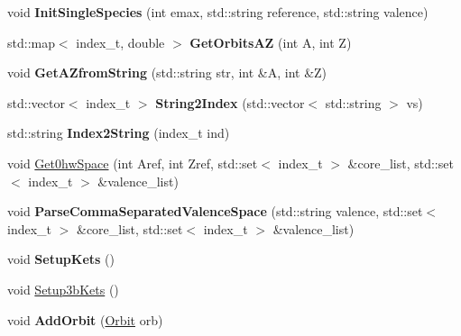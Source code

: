 \begin{DoxyCompactItemize}
\item 
\hypertarget{classModelSpace_acfa5baf0cba768c6abedbd3158892062}{void {\bfseries Init\-Single\-Species} (int emax, std\-::string reference, std\-::string valence)}\label{classModelSpace_acfa5baf0cba768c6abedbd3158892062}

\item 
\hypertarget{classModelSpace_a0cecf7817ce2bbf6c278924fd458e851}{std\-::map$<$ index\-\_\-t, double $>$ {\bfseries Get\-Orbits\-A\-Z} (int A, int Z)}\label{classModelSpace_a0cecf7817ce2bbf6c278924fd458e851}

\item 
\hypertarget{classModelSpace_a2370ffd4ec2d8e63db3a72b4a43784db}{void {\bfseries Get\-A\-Zfrom\-String} (std\-::string str, int \&A, int \&Z)}\label{classModelSpace_a2370ffd4ec2d8e63db3a72b4a43784db}

\item 
\hypertarget{classModelSpace_a11ac7aee125fb0a97cd3f1394c4cdb8f}{std\-::vector$<$ index\-\_\-t $>$ {\bfseries String2\-Index} (std\-::vector$<$ std\-::string $>$ vs)}\label{classModelSpace_a11ac7aee125fb0a97cd3f1394c4cdb8f}

\item 
\hypertarget{classModelSpace_ac22b0378c0775c58268238317b5389ee}{std\-::string {\bfseries Index2\-String} (index\-\_\-t ind)}\label{classModelSpace_ac22b0378c0775c58268238317b5389ee}

\item 
void \hyperlink{classModelSpace_a0e4d51e17aff61a2429eae0939426c16}{Get0hw\-Space} (int Aref, int Zref, std\-::set$<$ index\-\_\-t $>$ \&core\-\_\-list, std\-::set$<$ index\-\_\-t $>$ \&valence\-\_\-list)
\item 
\hypertarget{classModelSpace_a9a49b91242f1e53456ecb14ffbdfdd0c}{void {\bfseries Parse\-Comma\-Separated\-Valence\-Space} (std\-::string valence, std\-::set$<$ index\-\_\-t $>$ \&core\-\_\-list, std\-::set$<$ index\-\_\-t $>$ \&valence\-\_\-list)}\label{classModelSpace_a9a49b91242f1e53456ecb14ffbdfdd0c}

\item 
\hypertarget{classModelSpace_ae1a3578ed5aabec2956998a870a4e2d2}{void {\bfseries Setup\-Kets} ()}\label{classModelSpace_ae1a3578ed5aabec2956998a870a4e2d2}

\item 
void \hyperlink{classModelSpace_a0d453e9dc7fb9ca8c2f2549123e21556}{Setup3b\-Kets} ()
\item 
\hypertarget{classModelSpace_ad8acc2ca5b475862101595d911987a7e}{void {\bfseries Add\-Orbit} (\hyperlink{structOrbit}{Orbit} orb)}\label{classModelSpace_ad8acc2ca5b475862101595d911987a7e}


\end{DoxyCompactItemize}
